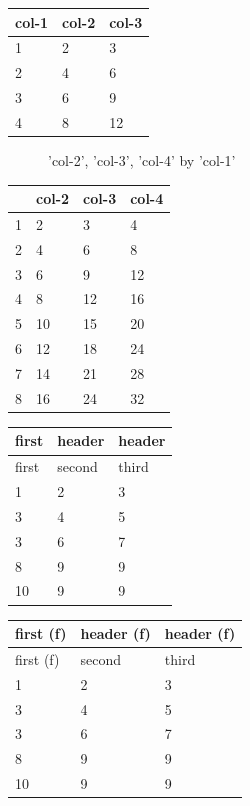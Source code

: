 \documentclass[11pt,a4paper]{article}
\begin{document}
\begin{table}[h]
\begin{tabular}{|l|l|l|}
\hline
col-1 & col-2 & col-3 \\ \hline
1 & 2 & 3 \\ \hline
2 & 4 & 6 \\ \hline
3 & 6 & 9 \\ \hline
4 & 8 & 12 \\ \hline
\end{tabular}
\end{table}

\begin{figure}[h]
\caption{'col-2', 'col-3', 'col-4' by 'col-1'}
\end{figure}

\begin{table}[h]
\begin{tabular}{|l|l|l|l|}
\hline
 & col-2 & col-3 & col-4 \\ \hline
1 & 2 & 3 & 4 \\ \hline
2 & 4 & 6 & 8 \\ \hline
3 & 6 & 9 & 12 \\ \hline
4 & 8 & 12 & 16 \\ \hline
5 & 10 & 15 & 20 \\ \hline
6 & 12 & 18 & 24 \\ \hline
7 & 14 & 21 & 28 \\ \hline
8 & 16 & 24 & 32 \\ \hline
\end{tabular}
\end{table}

\begin{table}[h]
\begin{tabular}{|l|l|l|}
\hline
first & header & header \\ \hline
first & second & third \\ \hline
1 & 2 & 3 \\ \hline
3 & 4 & 5 \\ \hline
3 & 6 & 7 \\ \hline
8 & 9 & 9 \\ \hline
10 & 9 & 9 \\ \hline
\end{tabular}
\end{table}

\begin{table}[h]
\begin{tabular}{|l|l|l|}
\hline
first (f) & header (f) & header (f) \\ \hline
first (f) & second & third \\ \hline
1 & 2 & 3 \\ \hline
3 & 4 & 5 \\ \hline
3 & 6 & 7 \\ \hline
8 & 9 & 9 \\ \hline
10 & 9 & 9 \\ \hline
\end{tabular}
\end{table}

\begin{figure}[h]
\end{figure}
\end{document}
